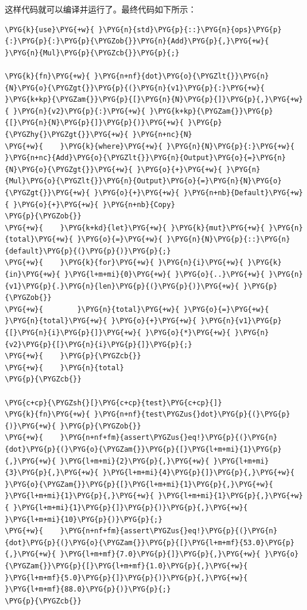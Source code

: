这样代码就可以编译并运行了。最终代码如下所示：

\begin{Verbatim}[commandchars=\\\{\},breaklines=true,breakanywhere=true,fontsize=\codefont,xleftmargin=17bp]
\PYG{k}{use}\PYG{+w}{ }\PYG{n}{std}\PYG{p}{::}\PYG{n}{ops}\PYG{p}{:}\PYG{p}{:}\PYG{p}{\PYGZob{}}\PYG{n}{Add}\PYG{p}{,}\PYG{+w}{ }\PYG{n}{Mul}\PYG{p}{\PYGZcb{}}\PYG{p}{;}

\PYG{k}{fn}\PYG{+w}{ }\PYG{n+nf}{dot}\PYG{o}{\PYGZlt{}}\PYG{n}{N}\PYG{o}{\PYGZgt{}}\PYG{p}{(}\PYG{n}{v1}\PYG{p}{:}\PYG{+w}{ }\PYG{k+kp}{\PYGZam{}}\PYG{p}{[}\PYG{n}{N}\PYG{p}{]}\PYG{p}{,}\PYG{+w}{ }\PYG{n}{v2}\PYG{p}{:}\PYG{+w}{ }\PYG{k+kp}{\PYGZam{}}\PYG{p}{[}\PYG{n}{N}\PYG{p}{]}\PYG{p}{)}\PYG{+w}{ }\PYG{p}{\PYGZhy{}\PYGZgt{}}\PYG{+w}{ }\PYG{n+nc}{N}
\PYG{+w}{    }\PYG{k}{where}\PYG{+w}{ }\PYG{n}{N}\PYG{p}{:}\PYG{+w}{ }\PYG{n+nc}{Add}\PYG{o}{\PYGZlt{}}\PYG{n}{Output}\PYG{o}{=}\PYG{n}{N}\PYG{o}{\PYGZgt{}}\PYG{+w}{ }\PYG{o}{+}\PYG{+w}{ }\PYG{n}{Mul}\PYG{o}{\PYGZlt{}}\PYG{n}{Output}\PYG{o}{=}\PYG{n}{N}\PYG{o}{\PYGZgt{}}\PYG{+w}{ }\PYG{o}{+}\PYG{+w}{ }\PYG{n+nb}{Default}\PYG{+w}{ }\PYG{o}{+}\PYG{+w}{ }\PYG{n+nb}{Copy}
\PYG{p}{\PYGZob{}}
\PYG{+w}{    }\PYG{k+kd}{let}\PYG{+w}{ }\PYG{k}{mut}\PYG{+w}{ }\PYG{n}{total}\PYG{+w}{ }\PYG{o}{=}\PYG{+w}{ }\PYG{n}{N}\PYG{p}{::}\PYG{n}{default}\PYG{p}{(}\PYG{p}{)}\PYG{p}{;}
\PYG{+w}{    }\PYG{k}{for}\PYG{+w}{ }\PYG{n}{i}\PYG{+w}{ }\PYG{k}{in}\PYG{+w}{ }\PYG{l+m+mi}{0}\PYG{+w}{ }\PYG{o}{..}\PYG{+w}{ }\PYG{n}{v1}\PYG{p}{.}\PYG{n}{len}\PYG{p}{(}\PYG{p}{)}\PYG{+w}{ }\PYG{p}{\PYGZob{}}
\PYG{+w}{        }\PYG{n}{total}\PYG{+w}{ }\PYG{o}{=}\PYG{+w}{ }\PYG{n}{total}\PYG{+w}{ }\PYG{o}{+}\PYG{+w}{ }\PYG{n}{v1}\PYG{p}{[}\PYG{n}{i}\PYG{p}{]}\PYG{+w}{ }\PYG{o}{*}\PYG{+w}{ }\PYG{n}{v2}\PYG{p}{[}\PYG{n}{i}\PYG{p}{]}\PYG{p}{;}
\PYG{+w}{    }\PYG{p}{\PYGZcb{}}
\PYG{+w}{    }\PYG{n}{total}
\PYG{p}{\PYGZcb{}}

\PYG{c+cp}{\PYGZsh{}[}\PYG{c+cp}{test}\PYG{c+cp}{]}
\PYG{k}{fn}\PYG{+w}{ }\PYG{n+nf}{test\PYGZus{}dot}\PYG{p}{(}\PYG{p}{)}\PYG{+w}{ }\PYG{p}{\PYGZob{}}
\PYG{+w}{    }\PYG{n+nf+fm}{assert\PYGZus{}eq!}\PYG{p}{(}\PYG{n}{dot}\PYG{p}{(}\PYG{o}{\PYGZam{}}\PYG{p}{[}\PYG{l+m+mi}{1}\PYG{p}{,}\PYG{+w}{ }\PYG{l+m+mi}{2}\PYG{p}{,}\PYG{+w}{ }\PYG{l+m+mi}{3}\PYG{p}{,}\PYG{+w}{ }\PYG{l+m+mi}{4}\PYG{p}{]}\PYG{p}{,}\PYG{+w}{ }\PYG{o}{\PYGZam{}}\PYG{p}{[}\PYG{l+m+mi}{1}\PYG{p}{,}\PYG{+w}{ }\PYG{l+m+mi}{1}\PYG{p}{,}\PYG{+w}{ }\PYG{l+m+mi}{1}\PYG{p}{,}\PYG{+w}{ }\PYG{l+m+mi}{1}\PYG{p}{]}\PYG{p}{)}\PYG{p}{,}\PYG{+w}{ }\PYG{l+m+mi}{10}\PYG{p}{)}\PYG{p}{;}
\PYG{+w}{    }\PYG{n+nf+fm}{assert\PYGZus{}eq!}\PYG{p}{(}\PYG{n}{dot}\PYG{p}{(}\PYG{o}{\PYGZam{}}\PYG{p}{[}\PYG{l+m+mf}{53.0}\PYG{p}{,}\PYG{+w}{ }\PYG{l+m+mf}{7.0}\PYG{p}{]}\PYG{p}{,}\PYG{+w}{ }\PYG{o}{\PYGZam{}}\PYG{p}{[}\PYG{l+m+mf}{1.0}\PYG{p}{,}\PYG{+w}{ }\PYG{l+m+mf}{5.0}\PYG{p}{]}\PYG{p}{)}\PYG{p}{,}\PYG{+w}{ }\PYG{l+m+mf}{88.0}\PYG{p}{)}\PYG{p}{;}
\PYG{p}{\PYGZcb{}}
\end{Verbatim}

